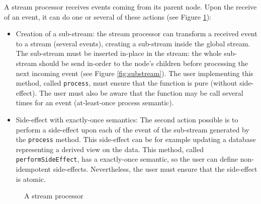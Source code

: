 A stream processor receives events coming from its parent node. Upon the receive of an event, it can do one or several of these
actions (see Figure \ref{fig:streamprocessor}):
\begin{itemize}
  \item Creation of a sub-stream: the stream processor can transform a received event to a stream (several events), creating a sub-stream
  inside the global stream. The sub-stream must be inserted in-place in the stream: the whole sub-stream should be
  send in-order to the node's children before processing the next incoming event (see Figure \ref{fig:substream}).
  The user implementing this method, called \verb|process|, must ensure that the function is pure (without side-effect).
  The user must also be aware that the function may be call several times for an event (at-least-once process semantic).
  \item Side-effect with exactly-once semantics: The second action possible is to perform a side-effect upon each of the event
  of the sub-stream generated by the \verb|process| method. This side-effect can be for example updating a database representing
  a derived view on the data. This method, called \verb|performSideEffect|, has a exactly-once semantic, so the user
  can define non-idempotent side-effects. Nevertheless, the user must ensure that the side-effect is atomic. 
\end{itemize}

\begin{figure}[h]
  \begin{center} 
    \caption{A stream processor}
    \label{fig:streamprocessor}
  \end{center}
\end{figure}

